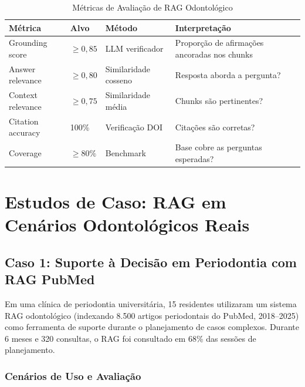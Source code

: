 \begin{table}[H]
\centering
\caption{Métricas de Avaliação de RAG Odontológico}
\label{tab:rag-metrics}
\begin{tabular}{p{3cm}p{2cm}p{2.5cm}p{4cm}}
\toprule
\textbf{Métrica} & \textbf{Alvo} & \textbf{Método} & \textbf{Interpretação} \\
\midrule
Grounding score & $\ge 0,85$ & LLM verificador & Proporção de afirmações ancoradas nos chunks \\
Answer relevance & $\ge 0,80$ & Similaridade cosseno & Resposta aborda a pergunta? \\
Context relevance & $\ge 0,75$ & Similaridade média & Chunks são pertinentes? \\
Citation accuracy & 100\% & Verificação DOI & Citações são corretas? \\
Coverage & $\ge 80\%$ & Benchmark & Base cobre as perguntas esperadas? \\
\bottomrule
\end{tabular}
\end{table}

\section{Estudos de Caso: RAG em Cenários Odontológicos Reais}

\subsection{Caso 1: Suporte à Decisão em Periodontia com RAG PubMed}

Em uma clínica de periodontia universitária, 15 residentes utilizaram um sistema RAG odontológico (indexando 8.500 artigos periodontais do PubMed, 2018--2025) como ferramenta de suporte durante o planejamento de casos complexos. Durante 6 meses e 320 consultas, o RAG foi consultado em 68\% das sessões de planejamento.

\subsubsection{Cenários de Uso e Avaliação}

